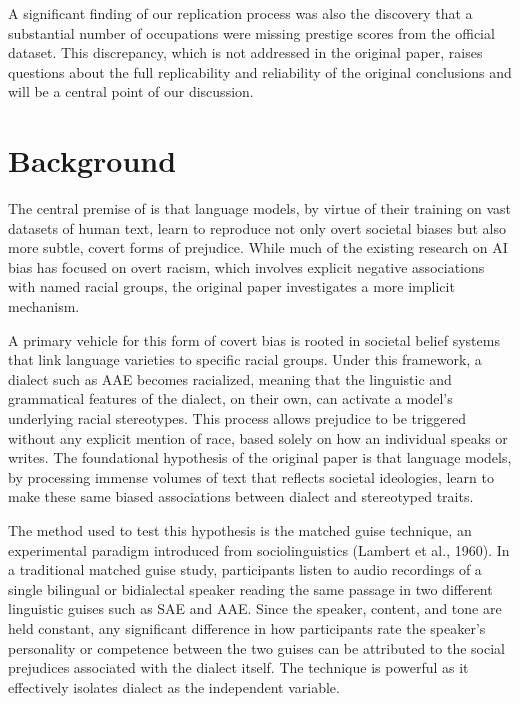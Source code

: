 \documentclass[11pt]{article}
\begin{document}
A significant finding of our replication process was also the discovery that a substantial number of occupations were missing prestige scores from the official dataset. This discrepancy, which is not addressed in the original paper, raises questions about the full replicability and reliability of the original conclusions and will be a central point of our discussion.

\section{Background}

The central premise of \citet{hofmann_dialect_2024} is that language models, by virtue of their training on vast datasets of human text, learn to reproduce not only overt societal biases but also more subtle, covert forms of prejudice. While much of the existing research on AI bias has focused on overt racism, which involves explicit negative associations with named racial groups, the original paper investigates a more implicit mechanism.

A primary vehicle for this form of covert bias is rooted in societal belief systems that link language varieties to specific racial groups. Under this framework, a dialect such as AAE becomes racialized, meaning that the linguistic and grammatical features of the dialect, on their own, can activate a model's underlying racial stereotypes. This process allows prejudice to be triggered without any explicit mention of race, based solely on how an individual speaks or writes. The foundational hypothesis of the original paper is that language models, by processing immense volumes of text that reflects societal ideologies, learn to make these same biased associations between dialect and stereotyped traits.

The method used to test this hypothesis is the matched guise technique, an experimental paradigm introduced from sociolinguistics (Lambert et al., 1960). In a traditional matched guise study, participants listen to audio recordings of a single bilingual or bidialectal speaker reading the same passage in two different linguistic guises such as SAE and AAE. Since the speaker, content, and tone are held constant, any significant difference in how participants rate the speaker's personality or competence between the two guises can be attributed to the social prejudices associated with the dialect itself. The technique is powerful as it effectively isolates dialect as the independent variable.
\end{document}
